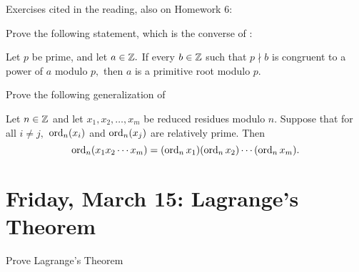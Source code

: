 \documentclass[letterpaper, 11 pt]{ximera}
\theoremstyle{definition}
\begin{document}
Exercises cited in the reading, also on Homework 6:



\begin{br}
    Prove the following statement, which is the converse of :

    Let $p$ be prime, and let $a\in\mathbb Z.$ If every $b\in\mathbb Z$ such that $p\nmid b$ is congruent to a power of $a$ modulo $p,$ then ${a}$ is a primitive root modulo $p$.
    
\end{br}

\begin{br}
    Prove the following generalization of 
    
    
    \begin{lem*}
        Let $n\in\mathbb Z$ and let $x_1,x_2,\dots,x_m$ be reduced residues modulo $n$.  Suppose that for all $i\neq j,$ $\operatorname{ord}_n(x_i)$ and $\operatorname{ord}_n(x_j)$ are relatively prime. Then \[\operatorname{ord}_n(x_1 x_2\cdots x_m)=(\operatorname{ord}_n x_1)(\operatorname{ord}_n x_2)\cdots (\operatorname{ord}_n x_m).\]
    \end{lem*}
\end{br}

\section{Friday, March 15: Lagrange's Theorem}
\begin{obj}
    \item Prove Lagrange's Theorem
\end{obj}
\end{document}
